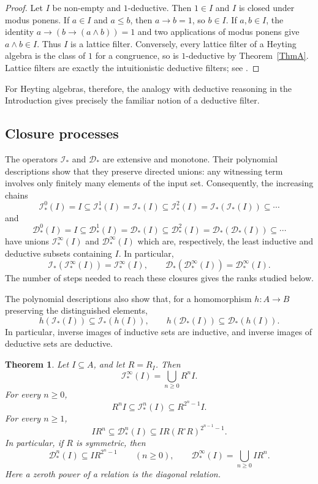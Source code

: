 \documentclass[12pt,english]{amsart}
\newtheorem{theorem}{Theorem}[section]
\theoremstyle{definition}
\numberwithin{equation}{section}
\theoremstyle{remark}
\newcommand{\ind}[1]{\mathcal{I}_\top(#1)}
\newcommand{\indn}[2]{\mathcal{I}^{#2}_\top(#1)}
\newcommand{\ded}[1]{\mathcal{D}_\top(#1)}
\newcommand{\dedn}[2]{\mathcal{D}^{#2}_\top(#1)}
\renewcommand{\top}{\ast}
\begin{document}
\begin{proof}
Let $I$ be non-empty and $1$-deductive. Then $1\in I$ and $I$ is closed under modus ponens. If $a\in I$ and $a\leqslant b$, then $a\to b=1$, so $b\in I$. If $a,b\in I$, the identity $a\to(b\to(a\wedge b))=1$ and two applications of modus ponens give $a\wedge b\in I$. Thus $I$ is a lattice filter. Conversely, every lattice filter of a Heyting algebra is the class of $1$ for a congruence, so is $1$-deductive by Theorem~\ref{ThmA}. Lattice filters are exactly the intuitionistic deductive filters; see \cite[Examples 1.9 and 2.6]{Mor23}.
\end{proof}

For Heyting algebras, therefore, the analogy with deductive reasoning in the Introduction gives precisely the familiar notion of a deductive filter.

\subsection{Closure processes}

The operators $\mathcal I_\top$ and $\mathcal D_\top$ are extensive and monotone. Their polynomial descriptions show that they preserve directed unions: any witnessing term involves only finitely many elements of the input set. Consequently, the increasing chains
\[
\indn I0=I\subseteq\indn I1=\ind I\subseteq
\indn I2=\ind{\ind I}\subseteq\cdots
\]
and
\[
\dedn I0=I\subseteq\dedn I1=\ded I\subseteq
\dedn I2=\ded{\ded I}\subseteq\cdots
\]
have unions $\indn I\infty$ and $\dedn I\infty$ which are, respectively, the least inductive and deductive subsets containing $I$. In particular,
\[
\ind{\indn I\infty}=\indn I\infty,
\qquad
\ded{\dedn I\infty}=\dedn I\infty.
\]
The number of steps needed to reach these closures gives the ranks studied below.

The polynomial descriptions also show that, for a homomorphism $h\colon A\to B$ preserving the distinguished elements,
\[
h(\mathcal I_\top(I))\subseteq\mathcal I_\top(h(I)),
\qquad
h(\mathcal D_\top(I))\subseteq\mathcal D_\top(h(I)).
\]
In particular, inverse images of inductive sets are inductive, and inverse images of deductive sets are deductive.

\begin{theorem}\label{ThmC}
Let $I\subseteq A$, and let $R=R_I$. Then
\[
\indn I\infty=\bigcup_{n\geqslant0}R^n I.
\]
For every $n\geqslant0$,
\[
R^n I\subseteq\indn In\subseteq R^{2^n-1}I.
\]
For every $n\geqslant1$,
\begin{equation}\label{EqGeneralDeductionBound}
IR^n\subseteq\dedn In
\subseteq IR(R^\circ R)^{2^{n-1}-1}.
\end{equation}
In particular, if $R$ is symmetric, then
\[
\dedn In\subseteq IR^{2^n-1}\qquad(n\geqslant0),
\qquad
\dedn I\infty=\bigcup_{n\geqslant0}IR^n.
\]
Here a zeroth power of a relation is the diagonal relation.
\end{theorem}
\end{document}
